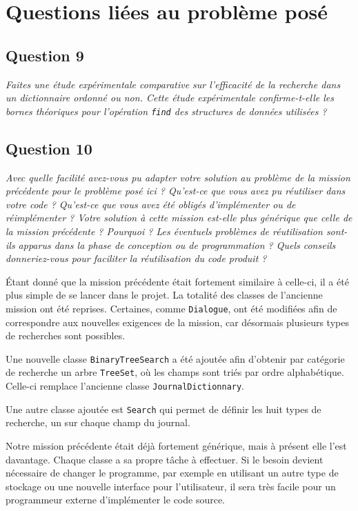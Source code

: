\documentclass[11pt]{article}
\begin{document}
\section{Questions liées au problème posé}

\subsection*{Question 9}
\textit{Faites une étude expérimentale comparative sur l’efficacité de la recherche dans un dictionnaire ordonné ou non. Cette étude expérimentale confirme-t-elle les bornes théoriques pour l’opération \texttt{find} des structures de données utilisées ?} \\ \medskip




\subsection*{Question 10}
\textit{Avec quelle facilité avez-vous pu adapter votre solution au problème de la mission précédente pour le problème posé ici ? Qu’est-ce que vous avez pu réutiliser dans votre code ? Qu’est-ce que
vous avez été obligés d’implémenter ou de réimplémenter ? Votre solution à cette mission est-elle plus générique que celle de la mission précédente ? Pourquoi ? Les éventuels problèmes de réutilisation sont-ils apparus dans la phase de conception ou de programmation ? Quels conseils donneriez-vous pour faciliter la réutilisation du code produit ?} \\ \medskip

Étant donné que la mission précédente était fortement similaire à celle-ci, il a été plus simple de se lancer dans le projet. 
La totalité des classes de l'ancienne mission ont été reprises. Certaines, comme \verb+Dialogue+, ont été modifiées afin de correspondre aux nouvelles exigences de la mission, car désormais plusieurs types de recherches sont possibles. 

Une nouvelle classe \verb+BinaryTreeSearch+ a été ajoutée afin d'obtenir par catégorie de recherche un arbre \verb+TreeSet+, où les champs sont triés par ordre alphabétique. Celle-ci remplace l'ancienne classe \verb+JournalDictionnary+.

Une autre classe ajoutée est \verb+Search+ qui permet de définir les huit types de recherche, un sur chaque champ du journal.

Notre mission précédente était déjà fortement générique, mais à présent elle l'est davantage. Chaque classe a sa propre tâche à effectuer. Si le besoin devient nécessaire de changer le programme, par exemple en utilisant un autre type de stockage ou une nouvelle interface pour l'utilisateur, il sera très facile pour un programmeur externe d'implémenter le code source.
\end{document}
